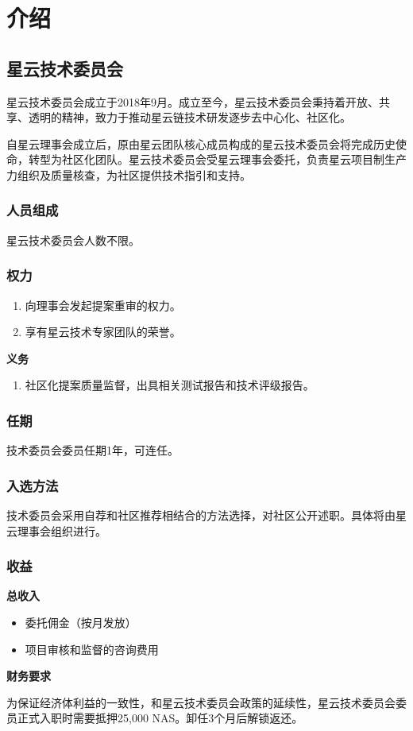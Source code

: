\section{介绍}
\subsection{星云技术委员会}

星云技术委员会成立于2018年9月。成立至今，星云技术委员会秉持着开放、共享、透明的精神，致力于推动星云链技术研发逐步去中心化、社区化。

自星云理事会成立后，原由星云团队核心成员构成的星云技术委员会将完成历史使命，转型为社区化团队。星云技术委员会受星云理事会委托，负责星云项目制生产力组织及质量核查，为社区提供技术指引和支持。

\subsubsection{人员组成}

星云技术委员会人数不限。

\subsubsection{权力}

\begin{enumerate}
	\item 向理事会发起提案重审的权力。
	\item 享有星云技术专家团队的荣誉。
\end{enumerate}

\textbf{义务}

\begin{enumerate}
	\item 社区化提案质量监督，出具相关测试报告和技术评级报告。
\end{enumerate}

\subsubsection{任期}

技术委员会委员任期1年，可连任。

\subsubsection{入选方法}

技术委员会采用自荐和社区推荐相结合的方法选择，对社区公开述职。具体将由星云理事会组织进行。

\subsubsection{收益}

\textbf{总收入}

\begin{itemize}
	\item 委托佣金（按月发放）
	\item 项目审核和监督的咨询费用
\end{itemize}

\vspace{2em}

\textbf{财务要求}

为保证经济体利益的一致性，和星云技术委员会政策的延续性，星云技术委员会委员正式入职时需要抵押25,000 NAS。卸任3个月后解锁返还。